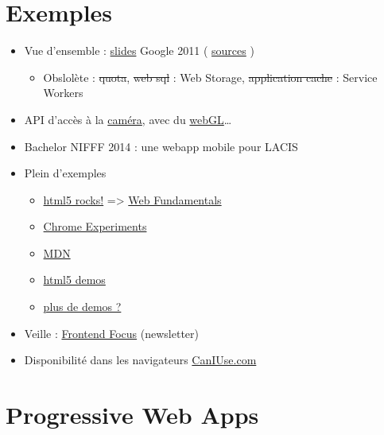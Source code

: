 \hypertarget{exemples}{%
\section{Exemples}\label{exemples}}

\begin{itemize}
\tightlist
\item
  Vue d'ensemble :
  \href{http://web.archive.org/web/20150525080904/http://slides.html5rocks.com/\#landing-slide}{slides}
  Google 2011 (
  \href{https://github.com/html5rocks/slides.html5rocks.com}{sources} )

  \begin{itemize}
  \tightlist
  \item
    Obslolète : \sout{quota}, \sout{web sql} : Web Storage,
    \sout{application cache} : Service Workers
  \end{itemize}
\item
  API d'accès à la
  \href{http://www.soundstep.com/blog/experiments/jsdetection/}{caméra},
  avec du
  \href{http://auduno.github.io/clmtrackr/examples/facesubstitution.html}{webGL}\ldots{}
\item
  Bachelor NIFFF 2014 : une webapp mobile pour LACIS
\item
  Plein d'exemples

  \begin{itemize}
  \tightlist
  \item
    \href{http://www.html5rocks.com/}{html5 rocks!} =\textgreater{}
    \href{https://developers.google.com/web/}{Web Fundamentals}
  \item
    \href{http://www.chromeexperiments.com/}{Chrome Experiments}
  \item
    \href{https://developer.mozilla.org/en-US/demos/tag/tech:html5}{MDN}
  \item
    \href{http://html5demos.com/}{html5 demos}
  \item
    \href{http://bit.ly/VJaqjb}{plus de demos ?}
  \end{itemize}
\item
  Veille : \href{http://html5weekly.com/}{Frontend Focus} (newsletter)
\item
  Disponibilité dans les navigateurs
  \href{https://caniuse.com/}{CanIUse.com}
\end{itemize}

\hypertarget{progressive-web-apps}{%
\section{Progressive Web Apps}\label{progressive-web-apps}}

